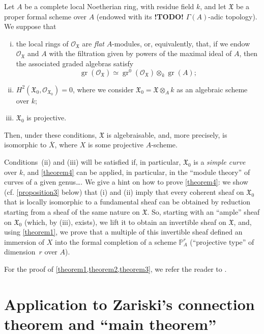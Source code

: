 \documentclass{article}
\theoremstyle{plain}
\newenvironment{theorem}[1]
  {\renewcommand\theinnercustomtheorem{#1}\innercustomtheorem}
  {\endinnercustomtheorem}
\newcommand{\sh}{\mathscr}
\newcommand{\fk}{\mathfrak}
\newcommand{\PP}{\mathbb{P}}
\DeclareMathOperator{\gr}{gr}
\newcommand{\todo}{\textbf{ !TODO! }}
\newcommand{\oldpage}[1]{\marginpar{\footnotesize$\Big\vert$ \textit{p.~#1}}}
\begin{document}
\begin{theorem}{4}
\label{theorem4}
  Let $A$ be a complete local Noetherian ring, with residue field $k$, and let $\fk{X}$ be a proper formal scheme over $A$ (endowed with its \todo $\Gamma(A)$-adic topology).
  We suppose that
  \begin{enumerate}[i.]
    \item the local rings of $\sh{O}_{\fk{X}}$ are \emph{flat} $A$-modules, or, equivalently, that, if we endow $\sh{O}_{\fk{X}}$ and $A$ with the filtration given by powers of the maximal ideal of $A$, then the associated graded algebras satisfy
      \[
        \gr(\sh{O}_{\fk{X}}) \simeq \gr^0(\sh{O}_{\fk{X}})\otimes_k\gr(A);
      \]
    \item $H^2(\fk{X}_0,\sh{O}_{\fk{X}_0})=0$, where we consider $\fk{X}_0=\fk{X}\otimes_Ak$ as an algebraic scheme over $k$;
\oldpage{182-07}
    \item $\fk{X}_0$ is projective.
  \end{enumerate}
  Then, under these conditions, $\fk{X}$ is algebraisable, and, more precisely, is isomorphic to $\overline{X}$, where $X$ is some projective $A$-scheme.
\end{theorem}

Conditions~(ii) and (iii) will be satisfied if, in particular, $\fk{X}_0$ is a \emph{simple curve} over $k$, and \cref{theorem4} can be applied, in particular, in the ``module theory'' of curves of a given genus\ldots.
We give a hint on how to prove \cref{theorem4}:
we show (cf. \cref{proposition3} below) that (i) and (ii) imply that every coherent sheaf on $\fk{X}_0$ that is locally isomorphic to a fundamental sheaf can be obtained by reduction starting from a sheaf of the same nature on $\fk{X}$.
So, starting with an ``ample'' sheaf on $\fk{X}_0$ (which, by (iii), exists), we lift it to obtain an invertible sheaf on $\fk{X}$, and, using \cref{theorem1}, we prove that a multiple of this invertible sheaf defined an immersion of $X$ into the formal completion of a scheme $\PP_A^r$ (``projective type'' of dimension~$r$ over $A$).

For the proof of \cref{theorem1,theorem2,theorem3}, we refer the reader to \cite{1}.


\section{Application to Zariski's connection theorem and ``main theorem''}
\label{section4}


\end{document}
